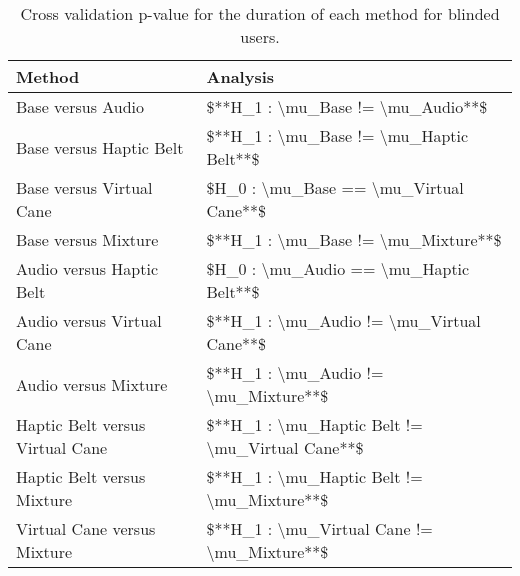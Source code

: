 
\begin{table}[!htb]
\centering
\caption{Cross validation p-value for the duration of each method for blinded users.}
\label{tab:lsd_duration}
\begin{tabular}{ll}
\toprule
                         Method &                                        Analysis \\
\midrule
              Base versus Audio &               \$**H\_1 : \textbackslash mu\_Base != \textbackslash mu\_Audio**\$ \\
        Base versus Haptic Belt &         \$**H\_1 : \textbackslash mu\_Base != \textbackslash mu\_Haptic Belt**\$ \\
       Base versus Virtual Cane &          \$H\_0 : \textbackslash mu\_Base == \textbackslash mu\_Virtual Cane**\$ \\
            Base versus Mixture &             \$**H\_1 : \textbackslash mu\_Base != \textbackslash mu\_Mixture**\$ \\
       Audio versus Haptic Belt &          \$H\_0 : \textbackslash mu\_Audio == \textbackslash mu\_Haptic Belt**\$ \\
      Audio versus Virtual Cane &       \$**H\_1 : \textbackslash mu\_Audio != \textbackslash mu\_Virtual Cane**\$ \\
           Audio versus Mixture &            \$**H\_1 : \textbackslash mu\_Audio != \textbackslash mu\_Mixture**\$ \\
Haptic Belt versus Virtual Cane & \$**H\_1 : \textbackslash mu\_Haptic Belt != \textbackslash mu\_Virtual Cane**\$ \\
     Haptic Belt versus Mixture &      \$**H\_1 : \textbackslash mu\_Haptic Belt != \textbackslash mu\_Mixture**\$ \\
    Virtual Cane versus Mixture &     \$**H\_1 : \textbackslash mu\_Virtual Cane != \textbackslash mu\_Mixture**\$ \\
\bottomrule
\end{tabular}
\end{table}

